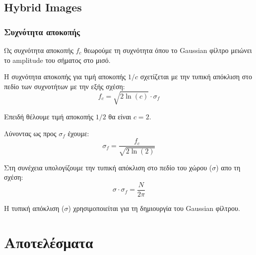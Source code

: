 \documentclass[11pt]{scrartcl} %
\begin{document}

\subsection{Hybrid Images}

\subsubsection{Συχνότητα αποκοπής}

Ως συχνότητα αποκοπής $f_c$ θεωρούμε τη συχνότητα όπου το Gaussian φίλτρο μειώνει το amplitude του σήματος στο μισό.

Η συχνότητα αποκοπής για τιμή αποκοπής $1/c$ σχετίζεται με την τυπική απόκλιση στο πεδίο των συχνοτήτων με την εξής σχέση:
\[f_c = \sqrt{2\ln(c)}\cdot\sigma_f\]

Επειδή θέλουμε τιμή αποκοπής $1/2$ θα είναι $c = 2$.

Λύνοντας ως προς $\sigma_f$ έχουμε:
\[\sigma_f = \frac{f_c}{\sqrt{2\ln(2)}}\]

Στη συνέχεια υπολογίζουμε την τυπική απόκλιση στο πεδίο του χώρου ($\sigma$) απο τη σχέση:
\[\sigma\cdot\sigma_f=\frac{N}{2\pi}\]

Η τυπική απόκλιση ($\sigma$) χρησιμοποιείται για τη δημιουργία του Gaussian φίλτρου.

\section{Αποτελέσματα}

\end{document}

